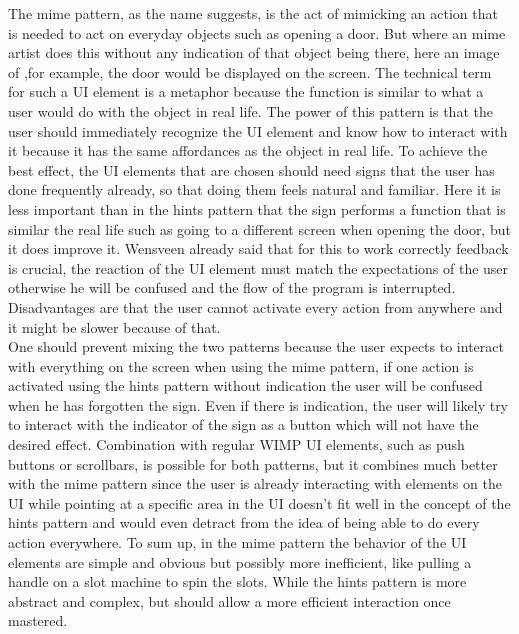 The mime pattern, as the name suggests, is the act of mimicking an action that is needed to act on everyday objects such as opening a door. But where an mime artist does this without any indication of that object being there, here an image of ,for example, the door would be displayed on the screen. The technical term for such a UI element is a metaphor because the function is similar to what a user would do with the object in real life. The power of this pattern is that the user should immediately recognize the UI element and know how to interact with it because it has the same affordances as the object in real life. To achieve the best effect, the UI elements that are chosen should need signs that the user has done frequently already, so that doing them feels natural and familiar. Here it is less important than in the hints pattern that the sign performs a function that is similar the real life such as going to a different screen when opening the door, but it does improve it. Wensveen \cite{Wensveen2004} already said that for this to work correctly feedback is crucial, the reaction of the UI element must match the expectations of the user otherwise he will be confused and the flow of the program is interrupted. Disadvantages are that the user cannot activate every action from anywhere and it might be slower because of that.\\

One should prevent mixing the two patterns because the user expects to interact with everything on the screen when using the mime pattern, if one action is activated using the hints pattern without indication the user will be confused when he has forgotten the sign. Even if there is indication, the user will likely try to interact with the indicator of the sign as a button which will not have the desired effect. Combination with regular WIMP UI elements, such as push buttons or scrollbars, is possible for both patterns, but it combines much better with the mime pattern since the user is already interacting with elements on the UI while pointing at a specific area in the UI doesn't fit well in the concept of the hints pattern and would even detract from the idea of being able to do every action everywhere. To sum up, in the mime pattern the behavior of the UI elements are simple and obvious but possibly more inefficient, like pulling a handle on a slot machine to spin the slots. While the hints pattern is more abstract and complex, but should allow a more efficient interaction once mastered.\\


